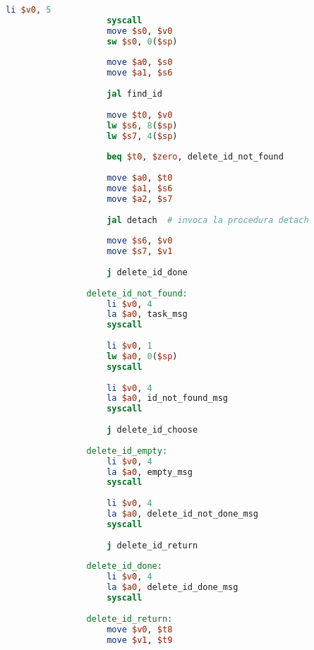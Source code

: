 \begin{center}
\begin{lstlisting}[language=mips, gobble=14, stepnumber=1]
                    li $v0, 5
                    syscall
                    move $s0, $v0
                    sw $s0, 0($sp)
                    
                    move $a0, $s0
                    move $a1, $s6
                    
                    jal find_id
                    
                    move $t0, $v0
                    lw $s6, 8($sp)
                    lw $s7, 4($sp)
                    
                    beq $t0, $zero, delete_id_not_found
                
                    move $a0, $t0
                    move $a1, $s6
                    move $a2, $s7
                    
                    jal detach  # invoca la procedura detach
                    
                    move $s6, $v0
                    move $s7, $v1
                    
                    j delete_id_done
                
                delete_id_not_found:
                    li $v0, 4
                    la $a0, task_msg
                    syscall
                    
                    li $v0, 1
                    lw $a0, 0($sp)
                    syscall
                    
                    li $v0, 4
                    la $a0, id_not_found_msg
                    syscall
                    
                    j delete_id_choose
                    
                delete_id_empty:
                    li $v0, 4
                    la $a0, empty_msg
                    syscall
                    
                    li $v0, 4
                    la $a0, delete_id_not_done_msg
                    syscall
                    
                    j delete_id_return
                    
                delete_id_done:
                    li $v0, 4
                    la $a0, delete_id_done_msg
                    syscall
                
                delete_id_return:
                    move $v0, $t8
                    move $v1, $t9
                    

\end{lstlisting}
\end{center}
